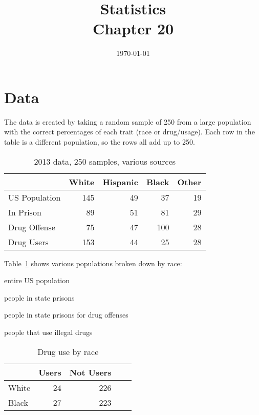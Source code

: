 \documentclass[letterpaper, landscape]{exam}
\title{Statistics \\ Chapter 20}
\date{\today}
\author{}
\begin{document}
  \maketitle
  \setcounter{tocdepth}{2}
  \tableofcontents

  \newpage

  \section{Data} %

  The data is created by taking a random sample of 250 from a large population
  with the correct percentages of each trait (race or drug/usage). Each row in the
  table is a different population, so the rows all add up to 250.

  \begin{table}
    \centering
    \begin{tabular}{lrrrr}
      \toprule
                     & White & Hispanic & Black & Other     \\
      \midrule                
      US Population  & 145   & 49       & 37    & 19       \\
      In Prison      & 89    & 51       & 81    & 29      \\
      Drug Offense   & 75    & 47       & 100   & 28      \\
      Drug Users     & 153   & 44       & 25    & 28       \\
      \bottomrule
    \end{tabular}
    \caption{2013 data, 250 samples, various sources}\label{tab:population}
  \end{table}

  Table~\ref{tab:population} shows various populations broken down by race:
  \begin{description}[parsep = 0pt]
    \item[US] entire US population
    \item[In Prison] people in state prisons 
    \item[Drug offense] people in state prisons for drug offenses
    \item[Drug Users] people that use illegal drugs
  \end{description}

  \begin{table}
    \centering
    \begin{tabular}{lrrrr}
      \toprule
            & Users & Not Users      \\
      \midrule
      White & 24    & 226 \\
      Black & 27    & 223 \\
      \bottomrule
    \end{tabular}
    \caption{Drug use by race}\label{tab:by_race}
  \end{table}
\end{document}
